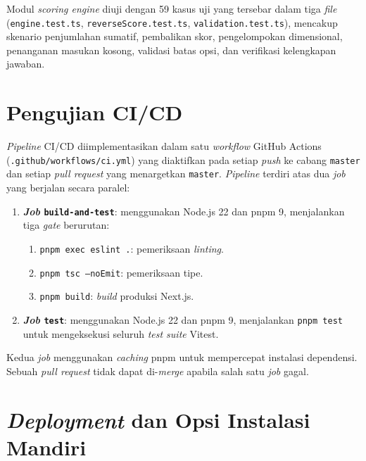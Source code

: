 Modul \textit{scoring engine} diuji dengan 59 kasus uji yang tersebar dalam tiga \textit{file} (\texttt{engine.test.ts}, \texttt{reverseScore.test.ts}, \texttt{validation.test.ts}), mencakup skenario penjumlahan sumatif, pembalikan skor, pengelompokan dimensional, penanganan masukan kosong, validasi batas opsi, dan verifikasi kelengkapan jawaban.

\section{Pengujian CI/CD}
\label{sec:impl-cicd}

\textit{Pipeline} CI/CD diimplementasikan dalam satu \textit{workflow} GitHub Actions (\texttt{.github/workflows/ci.yml}) yang diaktifkan pada setiap \textit{push} ke cabang \texttt{master} dan setiap \textit{pull request} yang menargetkan \texttt{master}. \textit{Pipeline} terdiri atas dua \textit{job} yang berjalan secara paralel:

\begin{enumerate}[leftmargin=2cm]
  \item \textbf{\textit{Job} \texttt{build-and-test}}: menggunakan Node.js 22 dan pnpm 9, menjalankan tiga \textit{gate} berurutan:
  \begin{enumerate}
    \item \texttt{pnpm exec eslint .}: pemeriksaan \textit{linting}.
    \item \texttt{pnpm tsc --noEmit}: pemeriksaan tipe.
    \item \texttt{pnpm build}: \textit{build} produksi Next.js.
  \end{enumerate}
  \item \textbf{\textit{Job} \texttt{test}}: menggunakan Node.js 22 dan pnpm 9, menjalankan \texttt{pnpm test} untuk mengeksekusi seluruh \textit{test suite} Vitest.
\end{enumerate}

Kedua \textit{job} menggunakan \textit{caching} pnpm untuk mempercepat instalasi dependensi. Sebuah \textit{pull request} tidak dapat di-\textit{merge} apabila salah satu \textit{job} gagal.

\section{\textit{Deployment} dan Opsi Instalasi Mandiri}
\label{sec:impl-deployment}

